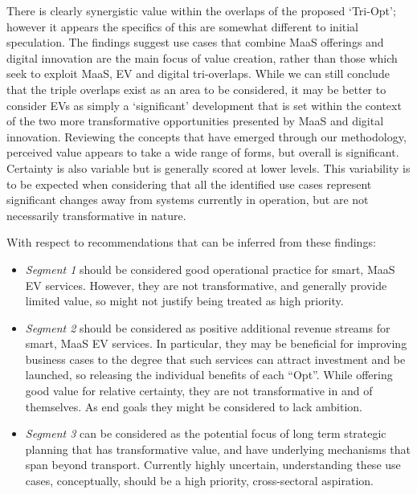 \documentclass[b5paper,10pt]{article}
\begin{document}

There is clearly synergistic value within the overlaps of the proposed
`Tri-Opt'; however it appears the specifics of this are somewhat
different to initial speculation. The findings suggest use cases that
combine MaaS offerings and digital innovation are the main focus of
value creation, rather than those which seek to exploit MaaS, EV and
digital tri-overlaps. While we can still conclude that the triple
overlaps exist as an area to be considered, it may be better to
consider EVs as simply a `significant' development that is set within
the context of the two more transformative opportunities presented by
MaaS and digital innovation. Reviewing the concepts that have emerged
through our methodology, perceived value appears to take a wide range
of forms, but overall is significant. Certainty is also variable but
is generally scored at lower levels. This variability is to be
expected when considering that all the identified use cases represent
significant changes away from systems currently in operation, but are not
necessarily transformative in nature.

With respect to recommendations that can be inferred from these findings:

\begin{itemize}
\item {\emph{Segment 1}} should be considered good operational
practice for smart, MaaS EV services. However, they are not
transformative, and generally provide limited value, so might not
justify being treated as high priority.
\item {\emph{Segment 2}} should be considered as positive additional
revenue streams for smart, MaaS EV services. In particular, they may
be beneficial for improving business cases to the degree that such
services can attract investment and be launched, so releasing the
individual benefits of each ``Opt''. While offering good value for
relative certainty, they are not transformative in and of themselves.
As end goals they might be considered to lack ambition.
\item {\emph{Segment 3}} can be considered as the potential focus of
long term strategic planning that has transformative value, and have
underlying mechanisms that span beyond transport. Currently highly
uncertain, understanding these use cases, conceptually, should be a
high priority, cross-sectoral aspiration.
\end{itemize}
\end{document}
